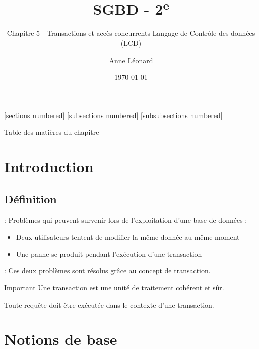 \documentclass[10pt]{beamer}
\title{SGBD - 2\textsuperscript{e}}
\subtitle{Chapitre 5 - Transactions et accès concurrents Langage de Contrôle des données (LCD)}
\date{\today}
\author{Anne Léonard}
\institute{Haute École de la Province de Liège}
\begin{document}
\maketitle

[sections numbered]
[subsections numbered]
[subsubsections numbered]
\begin{frame}[allowframebreaks]{Table des matières du chapitre}
    \tableofcontents[subsectionstyle=show/show/hide,subsubsectionstyle=show/show/hide,]
\end{frame}

\section{Introduction}
\tocss
\subsection{Définition}
\begin{frame}{\secname : \subsecname}
    Problèmes qui peuvent survenir lors de l'exploitation d'une base de données :
    \begin{itemize}
        \item Deux utilisateurs tentent de modifier la même donnée au même moment
        \item Une panne se produit pendant l'exécution d'une transaction
    \end{itemize}
\end{frame}

\begin{frame}{\secname : \subsecname}
    Ces deux problèmes sont résolus grâce au concept de transaction.
    \begin{alertblock}{Important}
        Une transaction est une unité de traitement cohérent et sûr.
    \end{alertblock}
    Toute requête doit être exécutée dans le contexte d'une transaction.
\end{frame}
\section{Notions de base}
\tocss
\end{document}
